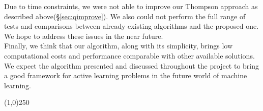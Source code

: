 \documentclass[12pt, a4paper, pdflatex, leqno, twoside]{report}
\begin{document}
Due to time constraints, we were not able to improve our Thompson approach as 
described above(\S\ref{sec:qimprove}). We also could not perform the full range of 
tests and comparisons between already existing algorithms and the proposed one. We 
hope to address these issues in the near future.\\

Finally, we think that our algorithm, along with its simplicity, brings low 
computational costs and performance comparable with other available solutions. 
We expect the algorithm presented and discussed throughout the project to bring a good framework for active 
learning problems in the future world of machine learning.\\

\begin{center}
\noindent \line(1,0){250}
\end{center}



{}
% 









\end{document}
